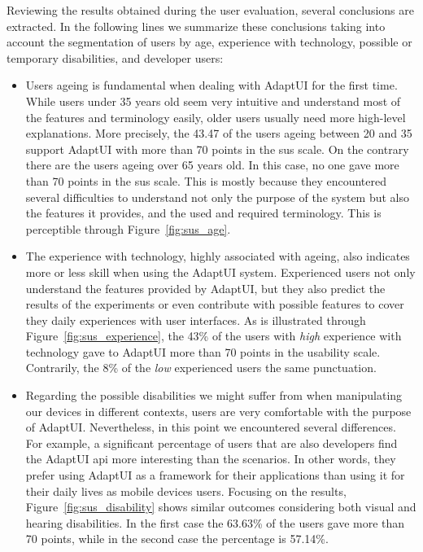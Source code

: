 Reviewing the results obtained during the user evaluation, several conclusions 
are extracted. In the following lines we summarize these conclusions taking into 
account the segmentation of users by age, experience with technology, possible 
or temporary disabilities, and developer users:

\begin{itemize}
  \item Users ageing is fundamental when dealing with AdaptUI for the first 
  time. While users under 35 years old seem very intuitive and understand most
  of the features and terminology easily, older users usually need more 
  high-level explanations. More precisely, the 43.47 of the users ageing between
  20 and 35 support AdaptUI with more than 70 points in the \ac{sus} scale. On the 
  contrary there are the users ageing over 65 years old. In this case, no one
  gave more than 70 points in the \ac{sus} scale. This is mostly because they 
  encountered several difficulties to understand not only the purpose of the
  system but also the features it provides, and the used and required 
  terminology. This is perceptible through Figure~\ref{fig:sus_age}.
  
  \item The experience with technology, highly associated with ageing, also 
  indicates more or less skill when using the AdaptUI system. Experienced users
  not only understand the features provided by AdaptUI, but they also predict
  the results of the experiments or even contribute with possible features to 
  cover they daily experiences with user interfaces. As is illustrated through
  Figure~\ref{fig:sus_experience}, the 43\% of the users with \textit{high} 
  experience with technology gave to AdaptUI more than 70 points in the 
  usability scale. Contrarily, the 8\% of the \textit{low} experienced users 
  the same punctuation.
  
  \item Regarding the possible disabilities we might suffer from when 
  manipulating our devices in different contexts, users are very comfortable 
  with the purpose of AdaptUI. Nevertheless, in this point we encountered 
  several differences. For example, a significant percentage of users that are
  also developers find the AdaptUI \ac{api} more interesting than the scenarios. 
  In other words, they prefer using AdaptUI as a framework for their applications
  than using it for their daily lives as mobile devices users. Focusing on the
  results, Figure~\ref{fig:sus_disability} shows similar outcomes considering
  both visual and hearing disabilities. In the first case the 63.63\% of the 
  users gave more than 70 points, while in the second case the percentage is 
  57.14\%.
  

\end{itemize}
